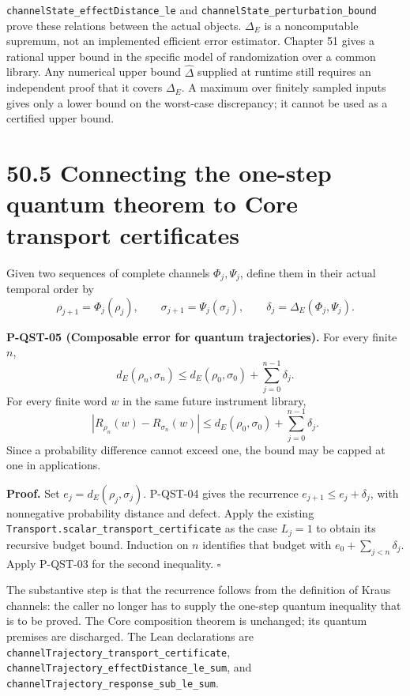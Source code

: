 \documentclass[
  11pt,
  oneside]{book}
\begin{document}
\texttt{channel\allowbreak State\_\allowbreak effect\allowbreak Distance\_\allowbreak le} and
\texttt{channel\allowbreak State\_\allowbreak perturbation\_\allowbreak bound} prove these relations between
the actual objects. \(\Delta_E\) is a noncomputable supremum, not an
implemented efficient error estimator. Chapter 51 gives a rational upper
bound in the specific model of randomization over a common library. Any
numerical upper bound \(\widehat\Delta\) supplied at runtime still
requires an independent proof that it covers \(\Delta_E\). A maximum
over finitely sampled inputs gives only a lower bound on the worst-case
discrepancy; it cannot be used as a certified upper bound.

\section{50.5 Connecting the one-step quantum theorem to Core transport
certificates}

Given two sequences of complete channels \(\Phi_j,\Psi_j\), define them
in their actual temporal order by \[
\rho_{j+1}=\Phi_j(\rho_j),\qquad
\sigma_{j+1}=\Psi_j(\sigma_j),\qquad
\delta_j=\Delta_E(\Phi_j,\Psi_j).
\]

\label{p-qst-05}{}

\textbf{P-QST-05 (Composable error for quantum trajectories).} For every
finite \(n\), \[
d_E(\rho_n,\sigma_n)
\le d_E(\rho_0,\sigma_0)+\sum_{j=0}^{n-1}\delta_j.
\] For every finite word \(w\) in the same future instrument library, \[
|R_{\rho_n}(w)-R_{\sigma_n}(w)|
\le d_E(\rho_0,\sigma_0)+\sum_{j=0}^{n-1}\delta_j.
\] Since a probability difference cannot exceed one, the bound may be
capped at one in applications.

\textbf{Proof.} Set \(e_j=d_E(\rho_j,\sigma_j)\). P-QST-04 gives the
recurrence \(e_{j+1}\le e_j+\delta_j\), with nonnegative probability
distance and defect. Apply the existing
\texttt{Transport.\allowbreak scalar\_\allowbreak transport\_\allowbreak certificate} as the case \(L_j=1\)
to obtain its recursive budget bound. Induction on \(n\) identifies that
budget with \(e_0+\sum_{j<n}\delta_j\). Apply P-QST-03 for the second
inequality. \(\square\)

The substantive step is that the recurrence follows from the definition
of Kraus channels: the caller no longer has to supply the one-step
quantum inequality that is to be proved. The Core composition theorem is
unchanged; its quantum premises are discharged. The Lean declarations
are \texttt{channel\allowbreak Trajectory\_\allowbreak transport\_\allowbreak certificate},
\texttt{channel\allowbreak Trajectory\_\allowbreak effect\allowbreak Distance\_\allowbreak le\_\allowbreak sum}, and
\texttt{channel\allowbreak Trajectory\_\allowbreak response\_\allowbreak sub\_\allowbreak le\_\allowbreak sum}.
\end{document}
